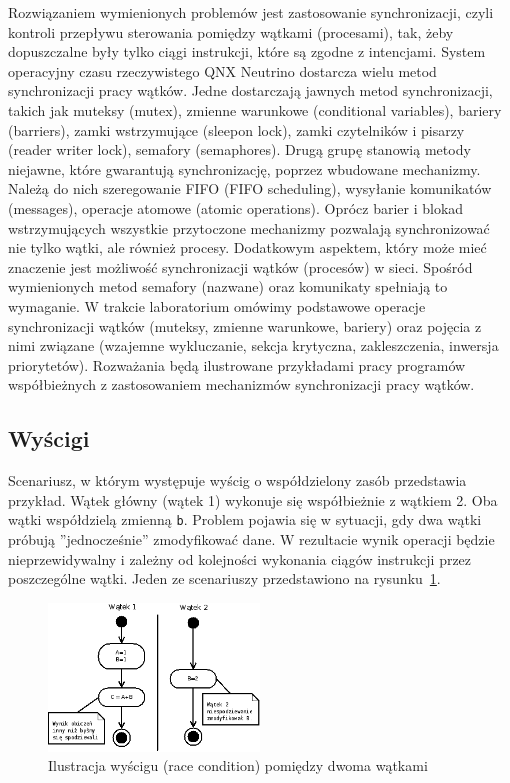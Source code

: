 Rozwiązaniem wymienionych problemów jest zastosowanie synchronizacji, czyli kontroli przepływu sterowania pomiędzy wątkami (procesami), tak, żeby dopuszczalne były tylko ciągi instrukcji, które są zgodne z intencjami. System operacyjny czasu rzeczywistego QNX Neutrino dostarcza wielu metod synchronizacji pracy wątków. Jedne dostarczają jawnych metod synchronizacji, takich jak muteksy (mutex), zmienne warunkowe (conditional variables), bariery (barriers), zamki wstrzymujące (sleepon lock), zamki czytelników i pisarzy (reader writer lock), semafory (semaphores). Drugą grupę stanowią metody niejawne, które gwarantują synchronizację, poprzez wbudowane mechanizmy. Należą do nich szeregowanie FIFO (FIFO scheduling), wysyłanie komunikatów (messages), operacje atomowe (atomic operations). Oprócz barier i blokad wstrzymujących wszystkie przytoczone mechanizmy pozwalają synchronizować nie tylko wątki, ale również procesy. Dodatkowym aspektem, który może mieć znaczenie jest możliwość synchronizacji wątków (procesów) w sieci. Spośród wymienionych metod semafory (nazwane) oraz komunikaty spełniają to wymaganie. 
W trakcie laboratorium omówimy podstawowe operacje synchronizacji wątków (muteksy, zmienne warunkowe, bariery) oraz pojęcia z nimi związane (wzajemne wykluczanie, sekcja krytyczna, zakleszczenia, inwersja priorytetów). Rozważania będą ilustrowane przykładami pracy programów współbieżnych z zastosowaniem mechanizmów synchronizacji pracy wątków.  

\subsection{Wyścigi} 

Scenariusz, w którym występuje wyścig o współdzielony zasób przedstawia przykład. Wątek główny (wątek 1) wykonuje się współbieżnie z wątkiem 2. Oba wątki współdzielą zmienną \lstinline[style=MyCStyle]{b}. Problem pojawia się w sytuacji, gdy dwa wątki próbują ''jednocześnie'' zmodyfikować dane. W rezultacie wynik operacji będzie nieprzewidywalny i zależny od kolejności wykonania ciągów instrukcji przez poszczególne wątki. Jeden ze scenariuszy przedstawiono na rysunku~\ref{fig:race}.  


\begin{figure}[!h]
\centering
\includegraphics[width=0.5\textwidth]{img/thrd_race}
\caption{Ilustracja wyścigu (race condition) pomiędzy dwoma wątkami}
\label{fig:race}
\end{figure}

